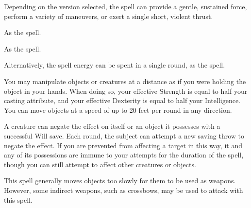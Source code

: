 \spellrng{\rngmed}
\begin{spelleffect}
  Depending on the version selected, the spell can provide a gentle, sustained force, perform a variety of maneuvers, or exert a single short, violent thrust.
  \par {} As the  spell.

  \par {} As the  spell.

  \par {} Alternatively, the spell energy can be spent in a single round, as the  spell.
\end{spelleffect}

\spellrng{\rngmed}
\begin{spelleffect}
  You may manipulate objects or creatures at a distance as if you were holding the object in your hands. When doing so, your effective Strength is equal to half your casting attribute, and your effective Dexterity is equal to half your Intelligence. You can move objects at a speed of up to 20 feet per round in any direction.

   A creature can negate the effect on itself or an object it possesses with a successful Will save. Each round, the subject can attempt a new saving throw to negate the effect. If you are prevented from affecting a target in this way, it and any of its possessions are immune to your attempts for the duration of the spell, though you can still attempt to affect other creatures or objects. 
\end{spelleffect}
\begin{spellnotes}
  This spell generally moves objects too slowly for them to be used as weapons. However, some indirect weapons, such as crossbows, may be used to attack with this spell. 
\end{spellnotes}

